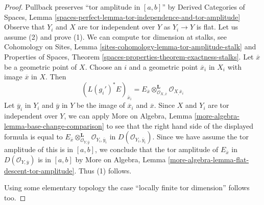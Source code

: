 \documentclass[10pt,a4paper]{amsart}
\theoremstyle{plain}
\theoremstyle{definition}
\theoremstyle{remark}
\numberwithin{equation}{subsection}
\begin{document}
\begin{proof}
Pullback preserves ``tor amplitude in $[a, b]$'' by
Derived Categories of Spaces, Lemma
\ref{spaces-perfect-lemma-tor-independence-and-tor-amplitude}
Observe that $Y_i$ and $X$ are tor independent over $Y$
as $Y_i \to Y$ is flat. Let us assume (2) and prove (1).
We can compute tor dimension at stalks, see
Cohomology on Sites, Lemma \ref{sites-cohomology-lemma-tor-amplitude-stalk}
and Properties of Spaces, Theorem
\ref{spaces-properties-theorem-exactness-stalks}.
Let $\overline{x}$ be a geometric point of $X$. Choose
an $i$ and a geometric point $\overline{x}_i$ in $X_i$ with image
$\overline{x}$ in $X$. Then
$$
(L(g_i')^*E)_{\overline{x}_i} =
E_{\overline{x}}
\otimes_{\mathcal{O}_{X, \overline{x}}}^\mathbf{L}
\mathcal{O}_{X_, \overline{x}_i}
$$
Let $\overline{y}_i$ in $Y_i$ and $\overline{y}$ in $Y$
be the image of $\overline{x}_i$ and $\overline{x}$.
Since $X$ and $Y_i$ are tor independent over $Y$, we can apply
More on Algebra, Lemma \ref{more-algebra-lemma-base-change-comparison}
to see that the right hand side of the displayed formula is equal to
$E_{\overline{x}}
\otimes_{\mathcal{O}_{Y, \overline{y}}}^\mathbf{L}
\mathcal{O}_{Y_i, \overline{y}_i}$
in $D(\mathcal{O}_{Y_i, \overline{y}_i})$.
Since we have assume the tor amplitude of this is in
$[a, b]$, we conclude that the tor amplitude of
$E_{\overline{x}}$ in $D(\mathcal{O}_{Y, \overline{y}})$
is in $[a, b]$ by More on Algebra, Lemma
\ref{more-algebra-lemma-flat-descent-tor-amplitude}.
Thus (1) follows.

\medskip\noindent
Using some elementary topology the case
``locally finite tor dimension'' follows too.
\end{proof}
\end{document}
